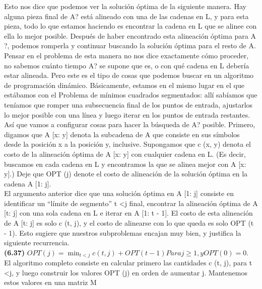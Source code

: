 \documentclass[a4paper, 12pt]{book}
\theoremstyle{dotless}
\begin{document}
Esto nos dice que podemos ver la solución óptima de la siguiente manera. Hay alguna pieza final de A? está alineado con una de las cadenas en L, y para esta pieza, todo lo que estamos haciendo es encontrar la cadena en L que se alinee con ella lo mejor posible. Después de haber encontrado esta alineación óptima para A ?, podemos romperla y continuar buscando la solución óptima para el resto de A.\\

Pensar en el problema de esta manera no nos dice exactamente cómo proceder, no sabemos cuánto tiempo A? se supone que es, o con qué cadena en L debería estar alineada. Pero este es el tipo de cosas que podemos buscar en un algoritmo de programación dinámico. Básicamente, estamos en el mismo lugar en el que estábamos con el Problema de mínimos cuadrados segmentados: allí sabíamos que teníamos que romper una subsecuencia final de los puntos de entrada, ajustarlos lo mejor posible con una línea y luego iterar en los puntos de entrada restantes.\\

Así que vamos a configurar cosas para hacer la búsqueda de A? posible. Primero, digamos que A [x: y] denota la subcadena de A que consiste en sus símbolos desde la posición x a la posición y, inclusive. Supongamos que c (x, y) denota el costo de la alineación óptima de A [x: y] con cualquier cadena en L. (Es decir, buscamos en cada cadena en L y encontramos la que se alinea mejor con A [x: y].) Deje que OPT (j) denote el costo de alineación de la solución óptima en la cadena A [1: j].\\

El argumento anterior dice que una solución óptima en A [1: j] consiste en identificar un ``límite de segmento'' t <j final, encontrar la alineación óptima de A [t: j] con una sola cadena en L e iterar en A [1: t - 1]. El costo de esta alineación de A [t: j] es solo c (t, j), y el costo de alinearse con lo que queda es solo OPT (t - 1). Esto sugiere que nuestros subproblemas encajan muy bien, y justifica la siguiente recurrencia.\\

\textbf{(6.37)} $OPT(j) = \min_{t<j} c(t, j) + OPT(t − 1) Para j ≥ 1, y OPT(0) = 0.$\\

El algoritmo completo consiste en calcular primero las cantidades c (t, j), para t <j, y luego construir los valores OPT (j) en orden de aumentar j. Mantenemos estos valores en una matriz M\\
\end{document}
